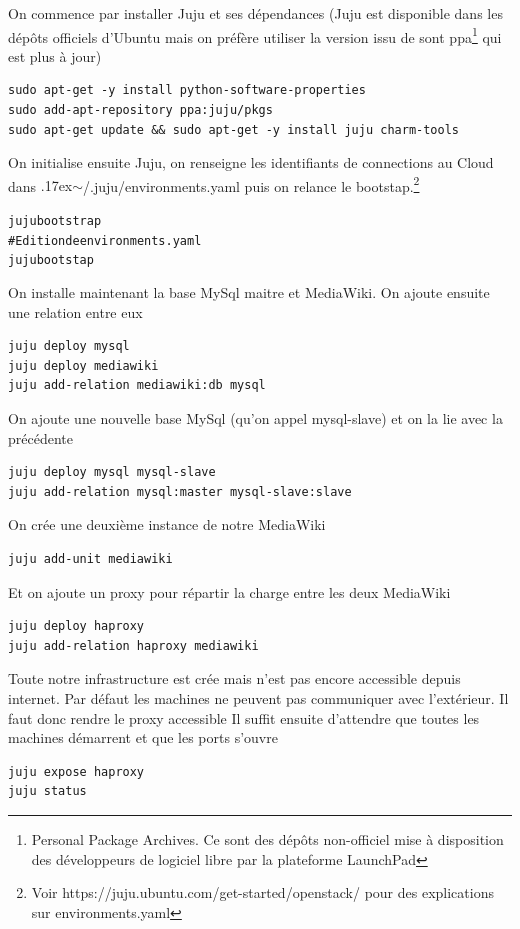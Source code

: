 \documentclass[a4paper,oneside]{report}
\begin{document}
On commence par installer Juju et ses dépendances (Juju est disponible dans les dépôts officiels d'Ubuntu mais on préfère utiliser la version issu de sont ppa\footnote{Personal Package Archives. Ce sont des dépôts non-officiel mise à disposition des développeurs de logiciel libre par la plateforme LaunchPad} qui est plus à jour)
\begin{verbatim}
sudo apt-get -y install python-software-properties
sudo add-apt-repository ppa:juju/pkgs
sudo apt-get update && sudo apt-get -y install juju charm-tools
\end{verbatim}

On initialise ensuite Juju, on renseigne les identifiants de connections au Cloud dans {\raise.17ex\hbox{$\scriptstyle\sim$}}/.juju/environments.yaml puis on relance le bootstap.\footnote{Voir https://juju.ubuntu.com/get-started/openstack/ pour des explications sur environments.yaml}
\begin{alltt}
juju bootstrap
# Edition de environments.yaml
juju bootstap
\end{alltt}

On installe maintenant la base MySql maitre et MediaWiki. On ajoute ensuite une relation entre eux
\begin{verbatim}
juju deploy mysql
juju deploy mediawiki
juju add-relation mediawiki:db mysql
\end{verbatim}

On ajoute une nouvelle base MySql (qu'on appel mysql-slave) et on la lie avec la précédente
\begin{verbatim}
juju deploy mysql mysql-slave
juju add-relation mysql:master mysql-slave:slave
\end{verbatim}

On crée une deuxième instance de notre MediaWiki
\begin{verbatim}
juju add-unit mediawiki
\end{verbatim}


Et on ajoute un proxy pour répartir la charge entre les deux MediaWiki
\begin{verbatim}
juju deploy haproxy
juju add-relation haproxy mediawiki
\end{verbatim}

Toute notre infrastructure est crée mais n'est pas encore accessible depuis internet. 
Par défaut les machines ne peuvent pas communiquer avec l'extérieur. Il faut donc rendre le proxy accessible
Il suffit ensuite d'attendre que toutes les machines démarrent et que les ports s'ouvre
\begin{verbatim}
juju expose haproxy
juju status
\end{verbatim}
\end{document}
